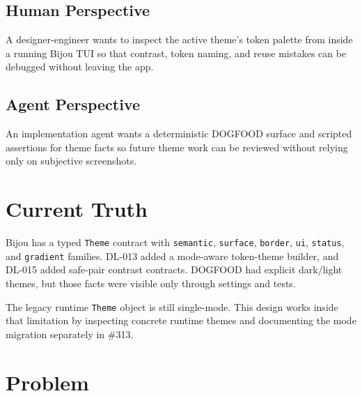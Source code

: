 \subsection{Human Perspective}\label{record-179-human-perspective}

A designer-engineer wants to inspect the active theme's token palette from inside a running Bijou TUI so that contrast, token naming, and reuse mistakes can be debugged without leaving the app.

\subsection{Agent Perspective}\label{record-179-agent-perspective}

An implementation agent wants a deterministic DOGFOOD surface and scripted assertions for theme facts so future theme work can be reviewed without relying only on subjective screenshots.

\section{Current Truth}\label{record-179-current-truth}

Bijou has a typed \texttt{T\allowbreak{}h\allowbreak{}e\allowbreak{}m\allowbreak{}e} contract with \texttt{s\allowbreak{}e\allowbreak{}m\allowbreak{}a\allowbreak{}n\allowbreak{}t\allowbreak{}i\allowbreak{}c}, \texttt{s\allowbreak{}u\allowbreak{}r\allowbreak{}f\allowbreak{}a\allowbreak{}c\allowbreak{}e}, \texttt{b\allowbreak{}o\allowbreak{}r\allowbreak{}d\allowbreak{}e\allowbreak{}r}, \texttt{u\allowbreak{}i}, \texttt{s\allowbreak{}t\allowbreak{}a\allowbreak{}t\allowbreak{}u\allowbreak{}s}, and \texttt{g\allowbreak{}r\allowbreak{}a\allowbreak{}d\allowbreak{}i\allowbreak{}e\allowbreak{}n\allowbreak{}t} families. DL-013 added a mode-aware token-theme builder, and DL-015 added safe-pair contrast contracts. DOGFOOD had explicit dark/light themes, but those facts were visible only through settings and tests.

The legacy runtime \texttt{T\allowbreak{}h\allowbreak{}e\allowbreak{}m\allowbreak{}e} object is still single-mode. This design works inside that limitation by inspecting concrete runtime themes and documenting the mode migration separately in \#313.

\section{Problem}\label{record-179-problem}

